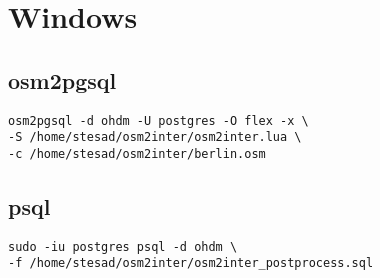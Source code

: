 \appendix
\chapter{Windows}
\section{osm2pgsql}\label{app:osm2pgsql:win}
\begin{lstlisting}
osm2pgsql -d ohdm -U postgres -O flex -x \
-S /home/stesad/osm2inter/osm2inter.lua \
-c /home/stesad/osm2inter/berlin.osm
\end{lstlisting}

\section{psql}\label{app:psql:win}
\begin{lstlisting}
sudo -iu postgres psql -d ohdm \
-f /home/stesad/osm2inter/osm2inter_postprocess.sql
\end{lstlisting}